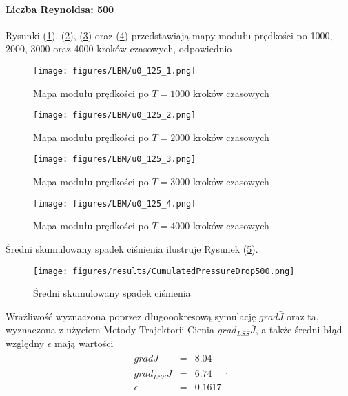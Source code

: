 \documentclass[12pt, twoside]{book}
\begin{document}
\paragraph{Liczba Reynoldsa: 500}
Rysunki (\ref{Fig46}), (\ref{Fig47}), (\ref{Fig48}) oraz (\ref{Fig49}) przedstawiają mapy modułu prędkości po 1000, 2000, 3000 oraz 4000 kroków czasowych, odpowiednio 
\begin{figure}[H]
	\texttt{[image: figures/LBM/u0\_125\_1.png]} 
	\caption{Mapa modułu prędkości po $ T=1000 $ kroków czasowych}
	\label{Fig46}
\end{figure}
\begin{figure}[H]
	\texttt{[image: figures/LBM/u0\_125\_2.png]} 
	\caption{Mapa modułu prędkości po $ T=2000 $ kroków czasowych}
	\label{Fig47}
\end{figure}
\begin{figure}[H]
	\texttt{[image: figures/LBM/u0\_125\_3.png]} 
	\caption{Mapa modułu prędkości po $ T=3000 $ kroków czasowych}
	\label{Fig48}
\end{figure}
\begin{figure}[H]
	\texttt{[image: figures/LBM/u0\_125\_4.png]} 
	\caption{Mapa modułu prędkości po $ T=4000 $ kroków czasowych}
	\label{Fig49}
\end{figure}
Średni skumulowany spadek ciśnienia ilustruje Rysunek (\ref{Fig50}).
\begin{figure}[H]
	\texttt{[image: figures/results/CumulatedPressureDrop500.png]} 
	\centering
	\caption{Średni skumulowany spadek ciśnienia}
	\label{Fig50}
\end{figure}
Wrażliwość wyznaczona poprzez długoookresową symulację $ grad\bar{J} $ oraz ta, wyznaczona z użyciem Metody Trajektorii Cienia $ grad_{LSS}\bar{J} $, a także średni błąd względny $ \epsilon $ mają wartości
\begin{equation}
\begin{array}{rcl}
grad\bar{J} &=& 8.04 \\
grad_{LSS}\bar{J} &=& 6.74 \\
\epsilon &=& 0.1617 
\end{array}.
\label{results500}
\end{equation} 
\end{document}
